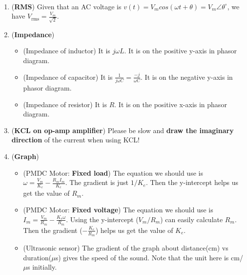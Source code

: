 \documentclass[10pt, landscape]{article}
\begin{document}
\hrulefill \\

\begin{multicols}{3}
\begin{enumerate}
    \item (\textbf{RMS}) Given that an AC voltage is $v(t)=V_mcos(\omega t+\theta)=V_m\angle \theta^{\circ}$, we have $V_{\text{rms}}=\frac{V_m}{\sqrt{2}}$.
    \item (\textbf{Impedance})
    \begin{itemize}
        \item (Impedance of inductor) It is $j\omega L$. It is on the positive y-axis in phasor diagram.
        \item (Impedance of capacitor) It is $\frac{1}{j\omega C}=\frac{-j}{\omega C}$. It is on the negative y-axis in phasor diagram.
        \item (Impedance of resistor) It is $R$. It is on the positive x-axis in phasor diagram.
    \end{itemize}
    \item (\textbf{KCL on op-amp amplifier}) Please be slow and \textbf{draw the imaginary direction} of the current when using KCL!
    \item (\textbf{Graph})
    \begin{itemize}
        \item (PMDC Motor: \textbf{Fixed load}) The equation we should use is $\omega = \frac{V_m}{K_e}-\frac{R_mI_m}{K_e}$. The gradient is just $1/K_e$. Then the y-intercept helps us get the value of $R_m$.
        \item (PMDC Motor: \textbf{Fixed voltage}) The equation we should use is $I_m=\frac{V_m}{R_m}-\frac{K_e\omega}{R_m}$. Using the y-intercept ($V_m/R_m$) can easily calculate $R_m$. Then the gradient ($-\frac{K_e}{R_m}$) helps us get the value of $K_e$.
        \item (Ultrasonic sensor) The gradient of the graph about distance(cm) vs duration($\mu$s) gives the speed of the sound. Note that the unit here is cm/$\mu$s initially.
    \end{itemize}
\end{enumerate}



\end{multicols}
\end{document}
